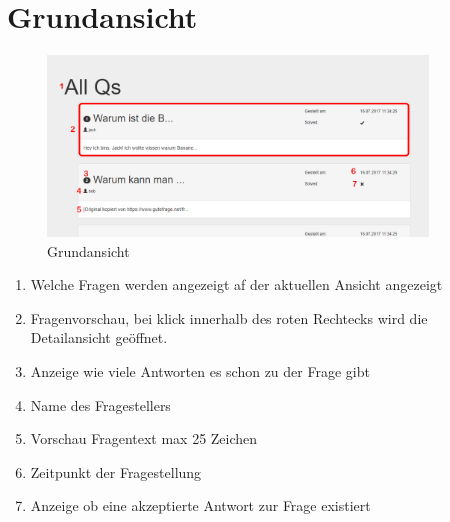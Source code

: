 \documentclass[a4paper]{report}
\begin{document}
\section{Grundansicht}
\begin{figure}[h!]
	\centering
	\includegraphics[width=0.9\textwidth]{./Bilder/AlleFragen.PNG}
	\caption{Grundansicht}
	\label{fig:Grundansicht}
\end{figure}
\centering\begin{enumerate}
	\item Welche Fragen werden angezeigt af der aktuellen Ansicht angezeigt
	\item Fragenvorschau, bei klick innerhalb des roten Rechtecks wird die Detailansicht geöffnet.
	\item Anzeige wie viele Antworten es schon zu der Frage gibt
	\item Name des Fragestellers
	\item Vorschau Fragentext max 25 Zeichen
	\item Zeitpunkt der Fragestellung
	\item Anzeige ob eine akzeptierte Antwort zur Frage existiert
\end{enumerate}
\newpage
\end{document}
